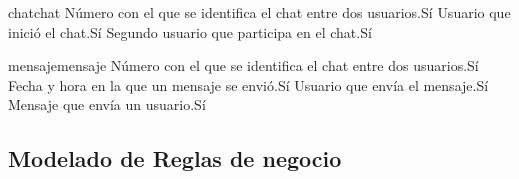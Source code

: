 \begin{cdtEntidad}{chat}{chat}
	{Número con el que se identifica el chat entre dos usuarios.}{Sí}
	{Usuario que inició el chat.}{Sí}
	{Segundo usuario que participa en el chat.}{Sí}
\end{cdtEntidad}
\begin{cdtEntidad}{mensaje}{mensaje}
	{Número con el que se identifica el chat entre dos usuarios.}{Sí}
	{Fecha y hora en la que un mensaje se envió.}{Sí}
	{Usuario que envía el mensaje.}{Sí}
	{Mensaje que envía un usuario.}{Sí}
\end{cdtEntidad}
\subsection{Modelado de Reglas de negocio}








